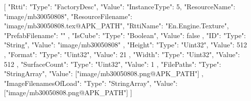 [{
        "Rtti": {
            "Type": "FactoryDesc",
            "Value": {
                "InstanceType": 5,
                "ResourceName": "image/mb30050808",
                "ResourceFilename": "image/mb30050808.tex@APK_PATH",
                "RttiName": "En.Engine.Texture",
                "PrefabFilename": ""
            }
        },
        "IsCube": {
            "Type": "Boolean",
            "Value": false
        },
        "ID": {
            "Type": "String",
            "Value": "image/mb30050808"
        },
        "Height": {
            "Type": "Uint32",
            "Value": 512
        },
        "Format": {
            "Type": "Uint32",
            "Value": 21
        },
        "Width": {
            "Type": "Uint32",
            "Value": 512
        },
        "SurfaceCount": {
            "Type": "Uint32",
            "Value": 1
        },
        "FilePaths": {
            "Type": "StringArray",
            "Value": ["image/mb30050808.png@APK_PATH"]
        },
        "ImageFilenamesOfLoad": {
            "Type": "StringArray",
            "Value": ["image/mb30050808.png@APK_PATH"]
        }
    }]
